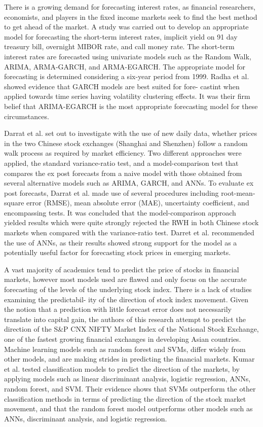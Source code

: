 \documentclass[times]{jtitauth}
\begin{document}
There is a growing demand for forecasting interest rates, as financial researchers, economists, and players in the fixed income markets seek to find the best method to get ahead of the market. A study was carried out to develop an appropriate model for forecasting the short-term interest rates, implicit yield on 91 day treasury bill, overnight MIBOR rate, and call money rate. The short-term interest rates are forecasted using univariate models such as the Random Walk, ARIMA, ARMA-GARCH, and ARMA-EGARCH. The appropriate model for forecasting is determined considering a six-year period from 1999. Radha et al. showed evidence that GARCH models are best suited for fore- castint when applied towards time series having volatility clustering effects. It was their firm belief that ARIMA-EGARCH is the most appropriate forecasting model for these circumstances.

Darrat et al. set out to investigate with the use of new daily data, whether prices in the two Chinese stock exchanges (Shanghai and Shenzhen) follow a random walk process as required by market efficiency. Two different approaches were applied, the standard variance-ratio test, and a model-comparison test that compares the ex post forecasts from a naive model with those obtained from several alternative models such as ARIMA, GARCH, and ANNs. To evaluate ex post forecasts, Darrat et al. made use of several procedures including root-mean-square error (RMSE), mean absolute error (MAE), uncertainty coefficient, and encompassing tests. It was concluded that the model-comparison approach yielded results which were quite strongly rejected the RWH in both Chinese stock markets when compared with the variance-ratio test. Darret et al. recommended the use of ANNs, as their results showed strong support for the model
as a potentially useful factor for forecasting stock prices in emerging markets.

A vast majority of academics tend to predict the price of stocks in financial markets, however most models used are flawed and only focus on the accurate forecasting of the levels of the underlying stock index. There is a lack of studies examining the predictabil- ity of the direction of stock index movement. Given the notion that a prediction with little forecast error does not necessarily translate into capital gain, the authors of this research attempt to predict the direction of the S\&P CNX NIFTY Market Index of the National Stock Exchange, one of the fastest growing financial exchanges in developing Asian countries. Machine learning models such as random forest and SVMs, differ widely from other models, and are making strides in predicting the financial markets. Kumar et al. tested classification models to predict the direction of the markets, by applying models such as linear discriminant analysis, logistic regression, ANNs, random forest, and SVM. Their evidence shows that SVMs outperform the other classification methods in terms of predicting the direction of the stock market movement, and that the random forest model outperforms other models such as ANNs, discriminant analysis, and logistic regression.
\end{document}
